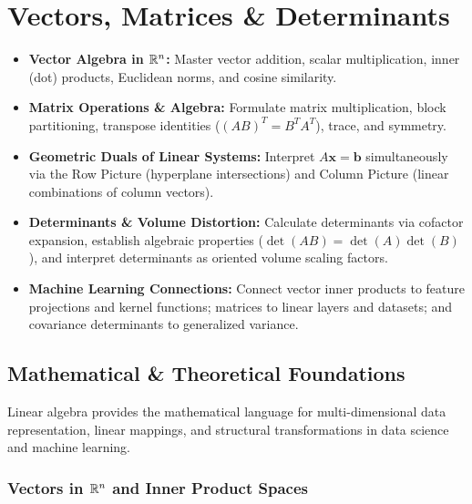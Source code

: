 \chapter{Vectors, Matrices \& Determinants}

\begin{tcolorbox}[colback=primarylight, colframe=primarydark, title={\textbf{Executive Roadmap \& Learning Objectives}}]
\begin{itemize}
    \item \textbf{Vector Algebra in $\mathbb{R}^n$:} Master vector addition, scalar multiplication, inner (dot) products, Euclidean norms, and cosine similarity.
    \item \textbf{Matrix Operations \& Algebra:} Formulate matrix multiplication, block partitioning, transpose identities ($(AB)^T = B^T A^T$), trace, and symmetry.
    \item \textbf{Geometric Duals of Linear Systems:} Interpret $A\mathbf{x} = \mathbf{b}$ simultaneously via the Row Picture (hyperplane intersections) and Column Picture (linear combinations of column vectors).
    \item \textbf{Determinants \& Volume Distortion:} Calculate determinants via cofactor expansion, establish algebraic properties ($\det(AB) = \det(A)\det(B)$), and interpret determinants as oriented volume scaling factors.
    \item \textbf{Machine Learning Connections:} Connect vector inner products to feature projections and kernel functions; matrices to linear layers and datasets; and covariance determinants to generalized variance.
\end{itemize}
\end{tcolorbox}

\section{Mathematical \& Theoretical Foundations}

Linear algebra provides the mathematical language for multi-dimensional data representation, linear mappings, and structural transformations in data science and machine learning.

\subsection{Vectors in $\mathbb{R}^n$ and Inner Product Spaces}

